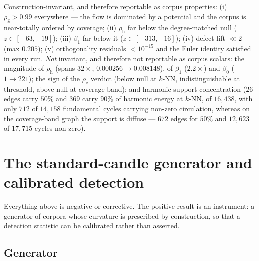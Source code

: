 \documentclass[11pt,a4paper]{article}
\theoremstyle{plain}
\theoremstyle{remark}
\theoremstyle{plain}
\begin{document}
Construction-invariant, and therefore reportable as corpus properties: (i) $\rho_{\mathrm g}>0.99$ everywhere --- the flow is dominated by a potential and the corpus is near-totally ordered by coverage; (ii) $\rho_{\mathrm h}$ far below the degree-matched null ($z\in[-63,-19]$); (iii) $\beta_1$ far below it ($z\in[-313,-16]$); (iv) defect lift $\ll2$ (max $0.205$); (v) orthogonality residuals $<10^{-15}$ and the Euler identity satisfied in every run. \emph{Not} invariant, and therefore not reportable as corpus scalars: the magnitude of $\rho_{\mathrm h}$ (spans $32\times$, $0.000256\to0.008148$), of $\beta_1$ ($2.2\times$) and $\beta_0$ ($1\to221$); the sign of the $\rho_{\mathrm c}$ verdict (below null at $k$-NN, indistinguishable at threshold, above null at coverage-band); and harmonic-support concentration ($26$ edges carry $50\%$ and $369$ carry $90\%$ of harmonic energy at $k$-NN, of $16{,}438$, with only $712$ of $14{,}158$ fundamental cycles carrying non-zero circulation, whereas on the coverage-band graph the support is diffuse --- $672$ edges for $50\%$ and $12{,}623$ of $17{,}715$ cycles non-zero).

\section{The standard-candle generator and calibrated detection}
\label{sec:candle}

Everything above is negative or corrective. The positive result is an instrument: a generator of corpora whose curvature is prescribed by construction, so that a detection statistic can be calibrated rather than asserted.

\subsection{Generator}
\end{document}
